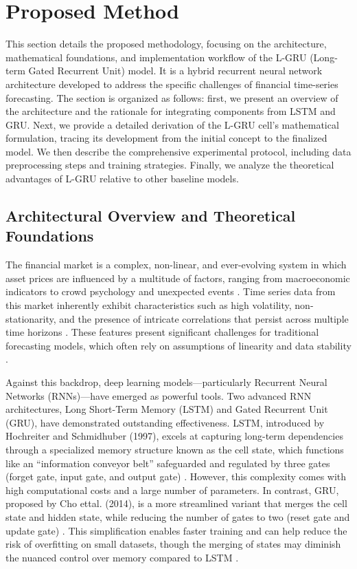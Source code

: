 \documentclass{cys}
\begin{document}
\section{Proposed Method}\label{sec:problem_formulation}
This section details the proposed methodology, focusing on the architecture, mathematical foundations, and implementation workflow of the L-GRU (Long-term Gated Recurrent Unit) model. It is a hybrid recurrent neural network architecture developed to address the specific challenges of financial time-series forecasting. The section is organized as follows: first, we present an overview of the architecture and the rationale for integrating components from LSTM and GRU. Next, we provide a detailed derivation of the L-GRU cell’s mathematical formulation, tracing its development from the initial concept to the finalized model. We then describe the comprehensive experimental protocol, including data preprocessing steps and training strategies. Finally, we analyze the theoretical advantages of L-GRU relative to other baseline models.


\subsection{Architectural Overview and Theoretical Foundations}
The financial market is a complex, non-linear, and ever-evolving system in which asset prices are influenced by a multitude of factors, ranging from macroeconomic indicators to crowd psychology and unexpected events \cite{akinrinola2024predicting}. Time series data from this market inherently exhibit characteristics such as high volatility, non-stationarity, and the presence of intricate correlations that persist across multiple time horizons \cite{refenes1994stock}. These features present significant challenges for traditional forecasting models, which often rely on assumptions of linearity and data stability \cite{makridakis2000m3}.

Against this backdrop, deep learning models—particularly Recurrent Neural Networks (RNNs)—have emerged as powerful tools. Two advanced RNN architectures, Long Short-Term Memory (LSTM) and Gated Recurrent Unit (GRU), have demonstrated outstanding effectiveness. LSTM, introduced by Hochreiter and Schmidhuber (1997), excels at capturing long-term dependencies through a specialized memory structure known as the cell state, which functions like an “information conveyor belt” safeguarded and regulated by three gates (forget gate, input gate, and output gate) \cite{hochreiter1997long}. However, this complexity comes with high computational costs and a large number of parameters. In contrast, GRU, proposed by Cho ettal. (2014), is a more streamlined variant that merges the cell state and hidden state, while reducing the number of gates to two (reset gate and update gate) \cite{cho2014learning}. This simplification enables faster training and can help reduce the risk of overfitting on small datasets, though the merging of states may diminish the nuanced control over memory compared to LSTM \cite{chung2014empirical}.
\end{document}

